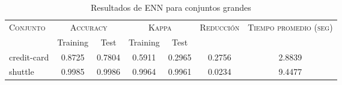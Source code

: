\begin{table}[]
\centering
\begin{tabular}{l c c c c c c}
\hline
\multirow{2}{*}{\textsc{Conjunto}}
	& \multicolumn{2}{c}{\textsc{Accuracy}}
	& \multicolumn{2}{c}{\textsc{Kappa}}
	& \textsc{Reducción}
	& \textsc{Tiempo promedio (seg)} \\
	& Training & Test
	& Training & Test \\ 
\hline
\hline

credit-card & 0.8725 & 0.7804 & 0.5911 & 0.2965 & 0.2756 & 2.8839 \\
shuttle & 0.9985 & 0.9986 & 0.9964 & 0.9961 & 0.0234 & 9.4477 \\

\hline
\end{tabular}
\caption{Resultados de ENN para conjuntos grandes }
\label{res-large-ENN}
\end{table}


